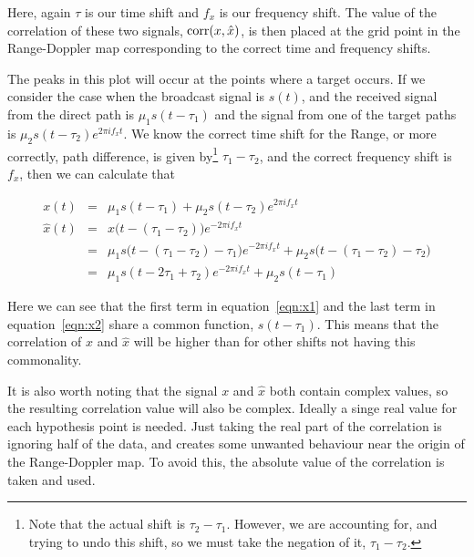 \documentclass[12pt,openany,a4paper]{book}
\begin{document}
Here, again $\tau$ is our time shift and $f_x$ is our frequency shift. The value of the correlation of these two signals, $\textnormal{corr}(x,\hat{x})$, is then placed at the grid point in the Range-Doppler map corresponding to the correct time and frequency shifts.

\bigskip

The peaks in this plot will occur at the points where a target occurs.
If we consider the case when the broadcast signal is $s(t)$, and the received signal from the direct path is $\mu_1s(t-\tau_1)$ and the signal from one of the target paths is $\mu_2s(t-\tau_2)e^{2\pi i f_x t}$. We know the correct time shift for the Range, or more correctly, path difference, is given by\footnote{Note that the actual shift is $\tau_2 - \tau_1$. However, we are accounting for, and trying to undo this shift, so we must take the negation of it, $\tau_1 - \tau_2$.} $\tau_1 - \tau_2$, and the correct frequency shift is $f_x$, then we can calculate that

\begin{eqnarray}
\label{eqn:x1}
x(t) & = & \mu_1s(t-\tau_1) + \mu_2s(t-\tau_2)e^{2\pi i f_x t} \\
\hat{x}(t) & = & x\bigg(t-(\tau_1 - \tau_2)\bigg) e^{ -2\pi i f_x t} \\
 & = & \mu_1s\bigg(t-(\tau_1 - \tau_2)-\tau_1\bigg)e^{ -2\pi i f_x t}	 + \mu_2s\bigg(t-(\tau_1 - \tau_2)-\tau_2\bigg) \\
 \label{eqn:x2}
  & = & \mu_1s(t-2\tau_1 + \tau_2)e^{ -2\pi i f_x t} + \mu_2s(t-\tau_1)
\end{eqnarray}

\bigskip

Here we can see that the first term in equation~\ref{eqn:x1} and the last term in equation~\ref{eqn:x2} share a common function, $s(t-\tau_1)$. This means that the correlation of $x$ and $\hat{x}$ will be higher than for other shifts not having this commonality.

\bigskip

It is also worth noting that the signal $x$ and $\hat{x}$ both contain complex values, so the resulting correlation value will also be complex. Ideally a singe real value for each hypothesis point is needed. Just taking the real part of the correlation is ignoring half of the data, and creates some unwanted behaviour near the origin of the Range-Doppler map. To avoid this, the absolute value of the correlation is taken and used.

\bigskip
\end{document}
